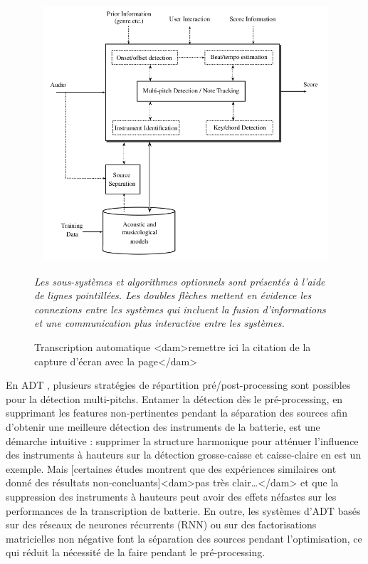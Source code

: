 \begin{figure}[!h]
	\centering
	\includegraphics[height=95mm, width=130mm]{z_images/1_contexte/1_general_process.png}
	\caption{Transcription automatique <dam>remettre ici la citation de la capture d'écran avec la page</dam>}
	\label{AMT_presentation}
	\textit{Les sous-systèmes et algorithmes optionnels sont présentés à l’aide
    de lignes pointillées. Les doubles flèches mettent en évidence les
connexions entre les systèmes qui incluent la fusion d’informations et une
communication plus interactive entre les systèmes.}
\end{figure}%

En ADT \cite{Review_ADT}, plusieurs stratégies de répartition
pré/post-processing sont possibles pour la détection multi-pitchs. Entamer la
détection dès le pré-processing, en supprimant les features non-pertinentes
pendant la séparation des sources afin d’obtenir une meilleure détection des
instruments de la batterie, est une démarche intuitive : supprimer la structure
harmonique pour atténuer l’influence des instruments à hauteurs  sur la détection grosse-caisse et caisse-claire en est un
exemple. 
Mais [certaines études montrent que des expériences similaires ont donné des
résultats non-concluants]<dam>pas très clair…</dam> et que la suppression des
instruments à hauteurs peut avoir des effets néfastes sur les performances de
la transcription de batterie. En outre, les systèmes d’ADT basés sur des
réseaux de neurones récurrents (RNN) ou sur des factorisations matricielles non
négative font la séparation des sources pendant l’optimisation, ce qui réduit
la nécessité de la faire pendant le pré-processing.

